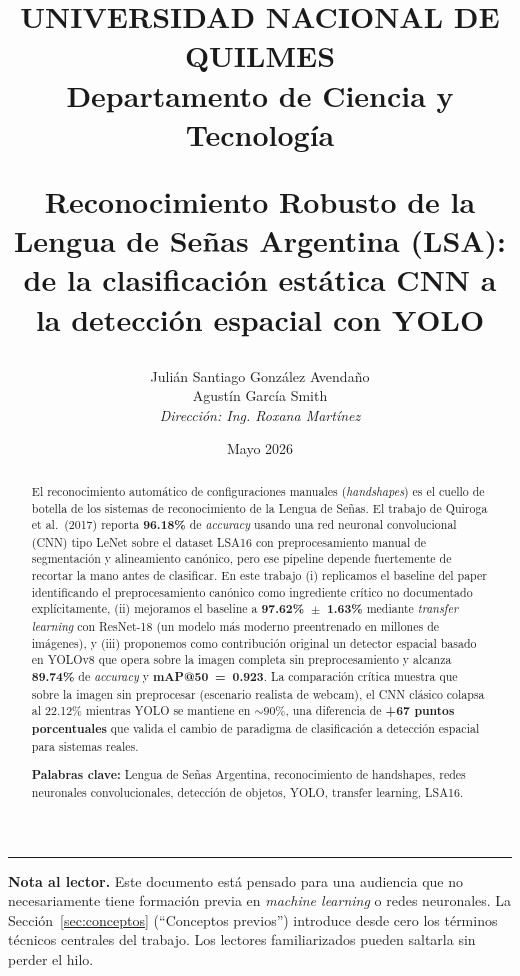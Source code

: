 \documentclass[a4paper,11pt]{article}
\title{
    \vspace{-2cm}
    \begin{center}
        \textbf{\large UNIVERSIDAD NACIONAL DE QUILMES} \\
        \vspace{0.4cm}
        \textbf{\large Departamento de Ciencia y Tecnología} \\
        \vspace{1.5cm}
    \end{center}
    \textbf{Reconocimiento Robusto de la Lengua de Señas Argentina (LSA):}\\
    \textbf{de la clasificación estática CNN a la detección espacial con YOLO}
}
\author{
    Julián Santiago González Avendaño \\
    Agustín García Smith \\[0.4cm]
    \textit{Dirección: Ing. Roxana Martínez}
}
\date{Mayo 2026}
\begin{document}
\maketitle
\thispagestyle{empty}

\begin{abstract}
\noindent El reconocimiento automático de configuraciones manuales (\textit{handshapes}) es el cuello de botella de los sistemas de reconocimiento de la Lengua de Señas. El trabajo de Quiroga et al.\ (2017) reporta \textbf{96.18\%} de \textit{accuracy} usando una red neuronal convolucional (CNN) tipo LeNet sobre el dataset LSA16 con preprocesamiento manual de segmentación y alineamiento canónico, pero ese pipeline depende fuertemente de recortar la mano antes de clasificar. En este trabajo (i) replicamos el baseline del paper identificando el preprocesamiento canónico como ingrediente crítico no documentado explícitamente, (ii) mejoramos el baseline a \textbf{97.62\%~$\pm$~1.63\%} mediante \textit{transfer learning} con ResNet-18 (un modelo más moderno preentrenado en millones de imágenes), y (iii) proponemos como contribución original un detector espacial basado en YOLOv8 que opera sobre la imagen completa sin preprocesamiento y alcanza \textbf{89.74\%} de \textit{accuracy} y \textbf{mAP@50~=~0.923}. La comparación crítica muestra que sobre la imagen sin preprocesar (escenario realista de webcam), el CNN clásico colapsa al 22.12\% mientras YOLO se mantiene en ${\sim}90\%$, una diferencia de \textbf{+67 puntos porcentuales} que valida el cambio de paradigma de clasificación a detección espacial para sistemas reales.

\vspace{0.4cm}
\noindent\textbf{Palabras clave:} Lengua de Señas Argentina, reconocimiento de handshapes, redes neuronales convolucionales, detección de objetos, YOLO, transfer learning, LSA16.
\end{abstract}

\vspace{0.6cm}
\hrule
\vspace{0.4cm}

\noindent\textbf{Nota al lector.} Este documento está pensado para una audiencia que no necesariamente tiene formación previa en \textit{machine learning} o redes neuronales. La Sección~\ref{sec:conceptos} (``Conceptos previos'') introduce desde cero los términos técnicos centrales del trabajo. Los lectores familiarizados pueden saltarla sin perder el hilo.
\end{document}
